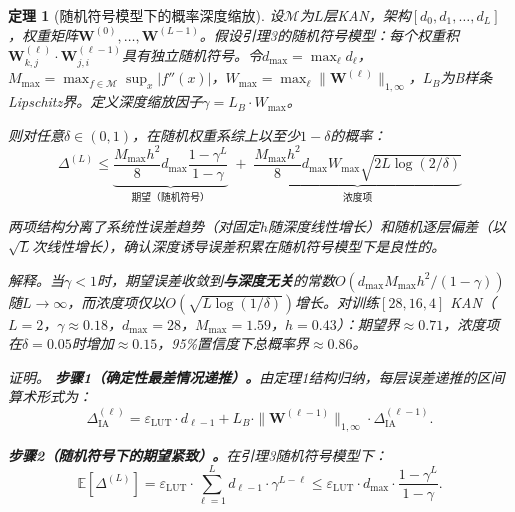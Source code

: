 \documentclass[journal,onecolumn]{IEEEtran}
\theoremstyle{definition}
\theoremstyle{plain}
\newtheorem{theorem}{定理}
\theoremstyle{remark}
\begin{document}
\begin{theorem}[随机符号模型下的概率深度缩放]
\label{thm:deep}
设$\mathcal{M}$为$L$层KAN，架构$[d_0, d_1, \dots, d_L]$，权重矩阵$\mathbf{W}^{(0)}, \dots, \mathbf{W}^{(L-1)}$。假设引理3的随机符号模型：每个权重积$\mathbf{W}^{(\ell)}_{k,j} \cdot \mathbf{W}^{(\ell-1)}_{j,i}$具有独立随机符号。令$d_{\max} = \max_\ell d_\ell$，$M_{\max} = \max_{f \in \mathcal{M}} \sup_x |f''(x)|$，$W_{\max} = \max_\ell \|\mathbf{W}^{(\ell)}\|_{1,\infty}$，$L_B$为B样条Lipschitz界。定义深度缩放因子$\gamma = L_B \cdot W_{\max}$。

则对任意$\delta \in (0,1)$，在随机权重系综上以至少$1-\delta$的概率：
{\small
\begin{equation}
\Delta^{(L)} \leq \underbrace{\frac{M_{\max} h^2}{8} d_{\max} \frac{1 - \gamma^L}{1 - \gamma}}_{\text{期望（随机符号）}} \;+\; \underbrace{\frac{M_{\max} h^2}{8} d_{\max} W_{\max} \sqrt{2L \log(2/\delta)}}_{\text{浓度项}}
\label{eq:deep_prob_bound}
\end{equation}}

两项结构分离了\textit{系统性}误差趋势（对固定$h$随深度线性增长）和\textit{随机}逐层偏差（以$\sqrt{L}$次线性增长），确认深度诱导误差积累在随机符号模型下是良性的。

\vspace{2pt}
\noindent\textit{解释。}当$\gamma < 1$时，期望误差收敛到\textbf{与深度无关}的常数$O(d_{\max} M_{\max} h^2/(1-\gamma))$随$L \to \infty$，而浓度项仅以$O(\sqrt{L \log(1/\delta)})$增长。对训练$[28,16,4]$ KAN（$L=2$，$\gamma \approx 0.18$，$d_{\max}=28$，$M_{\max}=1.59$，$h=0.43$）：期望界$\approx 0.71$，浓度项在$\delta=0.05$时增加$\approx 0.15$，95\%置信度下总概率界$\approx 0.86$。

\vspace{2pt}
\noindent\textit{证明。}
\textbf{步骤1（确定性最差情况递推）。}由定理1结构归纳，每层误差递推的区间算术形式为：
\begin{equation}
\Delta_{\text{IA}}^{(\ell)} = \varepsilon_{\text{LUT}} \cdot d_{\ell-1} + L_B \cdot \|\mathbf{W}^{(\ell-1)}\|_{1,\infty} \cdot \Delta_{\text{IA}}^{(\ell-1)}.
\end{equation}

\textbf{步骤2（随机符号下的期望紧致）。}在引理3随机符号模型下：
\begin{equation}
\mathbb{E}[\Delta^{(L)}] = \varepsilon_{\text{LUT}} \cdot \sum_{\ell=1}^L d_{\ell-1} \cdot \gamma^{L-\ell} \leq \varepsilon_{\text{LUT}} \cdot d_{\max} \cdot \frac{1-\gamma^L}{1-\gamma}.
\end{equation}


\end{theorem}
\end{document}
